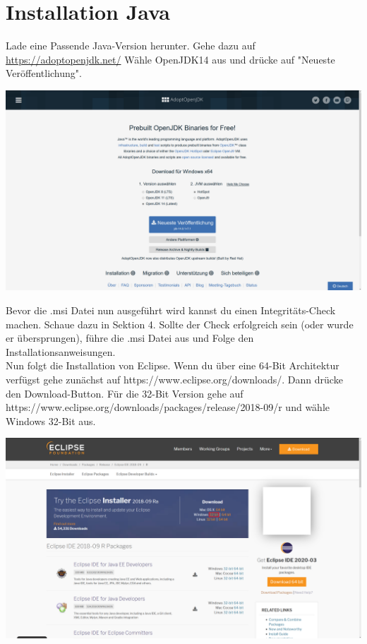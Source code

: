 \documentclass{scrartcl}
\begin{document}
\section{Installation Java}
Lade eine Passende Java-Version herunter. Gehe dazu auf \url{https://adoptopenjdk.net/} Wähle OpenJDK14
aus und drücke auf "Neueste Veröffentlichung".\\
\begin{center}
    \includegraphics[width=.75\textwidth]{Screenshot_6.png}
\end{center}
Bevor die .msi Datei nun ausgeführt wird kannst du einen Integritäts-Check machen.
Schaue dazu in Sektion 4.
Sollte der Check erfolgreich sein (oder wurde er übersprungen), führe die .msi Datei aus und Folge den Installationsanweisungen.\\
Nun folgt die Installation von Eclipse.
Wenn du über eine 64-Bit Architektur verfügst gehe zunächst auf https://www.eclipse.org/downloads/. Dann drücke den Download-Button.
Für die 32-Bit Version gehe auf https://www.eclipse.org/downloads/packages/release/2018-09/r und wähle Windows 32-Bit aus.\\

\begin{center}
    \includegraphics[width=.88\textwidth]{Screenshot_2.3.png}
\end{center}
\end{document}
